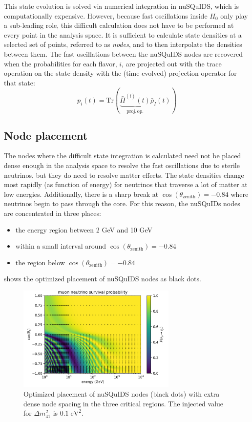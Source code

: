 This state evolution is solved via numerical integration in nuSQuIDS, which is computationally expensive. However, because fast oscillations inside $ H_0$ only play a sub-leading role, this difficult calculation does not have to be performed at every point in the analysis space. It is sufficient to calculate state densities at a selected set of points, referred to as \emph{nodes}, and to then interpolate the densities between them. The fast oscillations between the nuSQuIDS nodes are recovered when the probabilities for each flavor, $i$, are projected out with the trace operation on the state density with the (time-evolved) projection operator for that state:
$$
p_i(t)=\mathrm{Tr}(\underbrace{\bar{\Pi}^{(i)}(t)}_{\mathrm{proj.\,op.}}\bar{\rho}_I(t))
$$

\subsection{Node placement}
The nodes where the difficult state integration is calculated need not be placed dense enough in the analysis space to resolve the fast oscillations due to sterile neutrinos, but they do need to resolve matter effects. The state densities change most rapidly (as function of energy) for neutrinos that traverse a lot of matter at low energies. Additionally, there is a sharp break at $\cos(\theta_{\mathrm{zenith}})=-0.84$ where neutrinos begin to pass through the core. For this reason, the nuSQuIDs nodes are concentrated in three places:
\begin{itemize}
    \item the energy region between 2 GeV and 10 GeV
    \item within a small interval around $\cos(\theta_{\mathrm{zenith}})=-0.84$
    \item the region below $\cos(\theta_{\mathrm{zenith}})=-0.84$
\end{itemize}
 shows the optimized placement of nuSQuIDS nodes as black dots.

\begin{figure}
    \centering
    \includegraphics[width=0.7\textwidth]{figures/measurement/sterile_analysis/nusquids/0.1eV_sterile_only_height_avg_optim_nodes.png}
    \caption{Optimized placement of nuSQuIDS nodes (black dots) with extra dense node spacing in the three critical regions. The injected value for $\Delta m^2_{41}$ is $0.1\;\mathrm{eV^2}$.}
    \label{fig:nusquids-nodes}
\end{figure}

